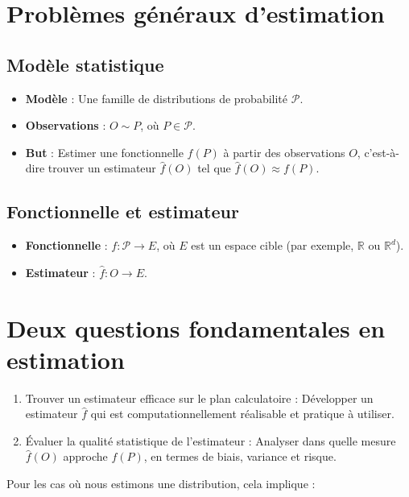 \documentclass{article}
\begin{document}
\section{Problèmes généraux d'estimation}

\subsection{Modèle statistique}

\begin{itemize}
    \item \textbf{Modèle} : Une famille de distributions de probabilité $\mathcal{P}$.
    \item \textbf{Observations} : $O \sim P$, où $P \in \mathcal{P}$.
    \item \textbf{But} : Estimer une fonctionnelle $f(P)$ à partir des observations $O$, c'est-à-dire trouver un estimateur $\hat{f}(O)$ tel que $\hat{f}(O) \approx f(P)$.
\end{itemize}

\subsection{Fonctionnelle et estimateur}

\begin{itemize}
    \item \textbf{Fonctionnelle} : $f: \mathcal{P} \rightarrow E$, où $E$ est un espace cible (par exemple, $\mathbb{R}$ ou $\mathbb{R}^d$).
    \item \textbf{Estimateur} : $\hat{f} : O \rightarrow E$.
\end{itemize}

\section{Deux questions fondamentales en estimation}

\begin{enumerate}
    \item Trouver un estimateur efficace sur le plan calculatoire : Développer un estimateur $\hat{f}$ qui est computationnellement réalisable et pratique à utiliser.
    \item Évaluer la qualité statistique de l'estimateur : Analyser dans quelle mesure $\hat{f}(O)$ approche $f(P)$, en termes de biais, variance et risque.
\end{enumerate}

Pour les cas où nous estimons une distribution, cela implique :
\end{document}
